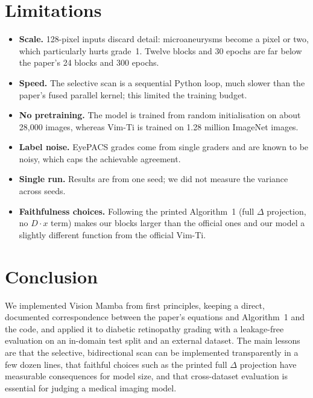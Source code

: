 \documentclass[11pt,a4paper]{article}
\begin{document}
\section{Limitations}

\begin{itemize}
  \item \textbf{Scale.} 128-pixel inputs discard detail: microaneurysms become a
        pixel or two, which particularly hurts grade~1. Twelve blocks and 30 epochs
        are far below the paper's 24 blocks and 300 epochs.
  \item \textbf{Speed.} The selective scan is a sequential Python loop, much slower
        than the paper's fused parallel kernel; this limited the training budget.
  \item \textbf{No pretraining.} The model is trained from random initialisation on
        about 28,000 images, whereas Vim-Ti is trained on 1.28 million ImageNet
        images.
  \item \textbf{Label noise.} EyePACS grades come from single graders and are known
        to be noisy, which caps the achievable agreement.
  \item \textbf{Single run.} Results are from one seed; we did not measure the
        variance across seeds.
  \item \textbf{Faithfulness choices.} Following the printed Algorithm~1 (full
        $\Delta$ projection, no $D\cdot x$ term) makes our blocks larger than the
        official ones and our model a slightly different function from the official
        Vim-Ti.
\end{itemize}

\section{Conclusion}

We implemented Vision Mamba from first principles, keeping a direct, documented
correspondence between the paper's equations and Algorithm~1 and the code, and
applied it to diabetic retinopathy grading with a leakage-free evaluation on an
in-domain test split and an external dataset.
The main lessons are that the selective, bidirectional scan can be implemented
transparently in a few dozen lines, that faithful choices such as the printed full
$\Delta$ projection have measurable consequences for model size, and that
cross-dataset evaluation is essential for judging a medical imaging model.



\end{document}
